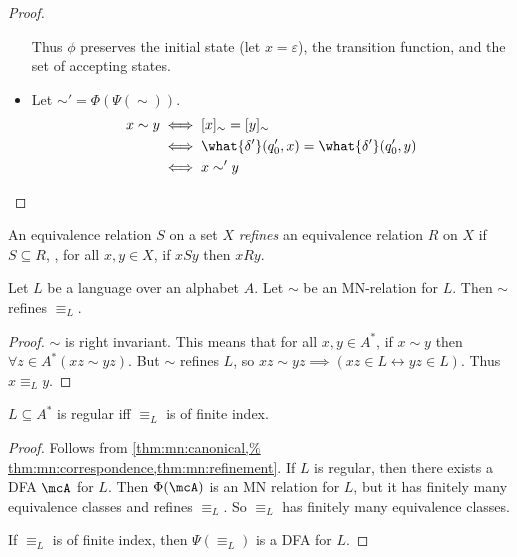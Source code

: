\begin{proof}
\begin{itemize}
        Thus $\phi$ preserves the initial state (let $x = \varepsilon$), the
        transition function, and the set of accepting states.
        \item Let ${\sim'} = \Phi(\Psi({\sim}))$.
        \begin{align*}
            x \sim y &\iff [x]_{\sim} = [y]_{\sim} \\
            &\iff \what{\delta'}(q'_0, x) = \what{\delta'}(q'_0, y) \\
            &\iff x \sim' y \qedhere
        \end{align*}
    \end{itemize}
\end{proof}

\begin{definition} \label{def:eq:refinement}
    An equivalence relation $S$ on a set $X$ \emph{refines} an equivalence
    relation $R$ on $X$ if $S \subseteq R$, \ie, for all $x, y \in X$,
    if $xSy$ then $xRy$.
\end{definition}

\begin{lemma*} \label{thm:mn:refinement}
    Let $L$ be a language over an alphabet $A$.
    Let $\sim$ be an MN-relation for $L$.
    Then $\sim$ refines $\equiv_L$.
\end{lemma*}
\begin{proof}
    $\sim$ is right invariant.
    This means that for all $x, y \in A^*$, if $x \sim y$ then
    $\forall z \in A^* (xz \sim yz)$.
    But $\sim$ refines $L$, so $xz \sim yz \implies
    (xz \in L \longleftrightarrow yz \in L)$.
    Thus $x \equiv_L y$.
\end{proof}

\begin{theorem*} \label{thm:mn:mn}
    $L \subseteq A^*$ is regular iff $\equiv_L$ is of finite index.
\end{theorem*}
\begin{proof}
    Follows from \cref{thm:mn:canonical,%
    thm:mn:correspondence,thm:mn:refinement}.
    If $L$ is regular, then there exists a DFA $\mcA$ for $L$.
    Then $\Phi(\mcA)$ is an MN relation for $L$, but it has finitely many
    equivalence classes and refines $\equiv_L$.
    So $\equiv_L$ has finitely many equivalence classes.

    If $\equiv_L$ is of finite index, then $\Psi(\equiv_L)$ is a DFA for
    $L$.
\end{proof}
